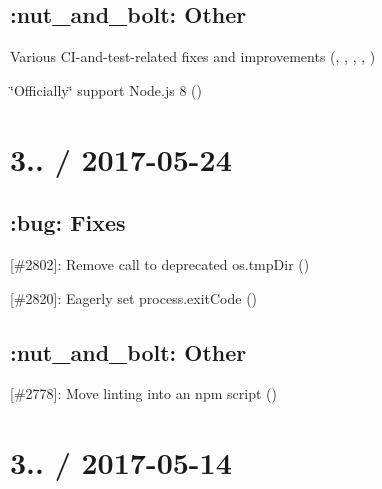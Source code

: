 \subsection*{\+:nut\+\_\+and\+\_\+bolt\+: Other}


\begin{DoxyItemize}
\item Various C\+I-\/and-\/test-\/related fixes and improvements (\href{https://github.com/boneskull}{\tt }, \href{https://github.com/dasilvacontin}{\tt }, \href{https://github.com/PopradiArpad}{\tt }, \href{https://github.com/munter}{\tt }, \href{https://github.com/ScottFreeCode}{\tt })
\item \char`\"{}\+Officially\char`\"{} support Node.\+js 8 (\href{https://github.com/elergy}{\tt })
\end{DoxyItemize}

\section*{3.. / 2017-\/05-\/24}

\subsection*{\+:bug\+: Fixes}


\begin{DoxyItemize}
\item \mbox{[}\#2802\mbox{]}\+: Remove call to deprecated {\ttfamily os.\+tmp\+Dir} (\href{https://github.com/makepanic}{\tt })
\item \mbox{[}\#2820\mbox{]}\+: Eagerly set {\ttfamily process.\+exit\+Code} (\href{https://github.com/chrisleck}{\tt })
\end{DoxyItemize}

\subsection*{\+:nut\+\_\+and\+\_\+bolt\+: Other}


\begin{DoxyItemize}
\item \mbox{[}\#2778\mbox{]}\+: Move linting into an npm script (\href{https://github.com/munter}{\tt })
\end{DoxyItemize}

\section*{3.. / 2017-\/05-\/14}

